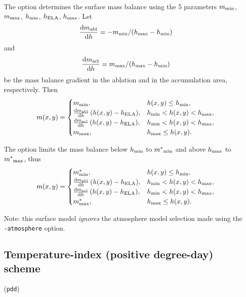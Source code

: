 \documentclass[titlepage,letterpaper,final]{scrartcl}
\begin{document}
The option  determines the surface mass balance using the 5 parameters ${m}_{\text{min}}$, ${m}_{\text{max}}$, ${h}_{\text{min}}$, ${h}_{\text{ELA}}$, ${h}_{\text{max}}$. Let
\begin{equation}
  \frac{\mathrm{d}{m}_{\text{abl}}}{\mathrm{d}h} = -{m}_{\text{min}} / ({h}_{\text{max}} - {h}_{\text{min}})
\end{equation}
and
\begin{equation}
\frac{\mathrm{d}{m}_{\text{acl}}}{\mathrm{d}h} = {m}_{\text{max}} / ({h}_{\text{max}} - {h}_{\text{min}})
\end{equation}
be the mass balance gradient in the ablation and in the accumulation area, respectively.  Then
\begin{equation}
  m(x,y) =
  \begin{cases}
   {m}_{\text{min}}, & h(x,y) \le {h}_{\text{min}}, \\
   \frac{\mathrm{d}{m}_{\text{abl}}}{\mathrm{d}h} \, (h(x,y) - h_{\text{ELA}}), &  {h}_{\text{min}} < h(x,y) < {h}_{\text{max}}, \\
   \frac{\mathrm{d}{m}_{\text{acl}}}{\mathrm{d}h} \, (h(x,y) - h_{\text{ELA}}), & {h}_{\text{min}} < h(x,y) < {h}_{\text{max}}, \\
   {m}_{\text{max}}, & {h}_{\text{max}} \le h(x,y).
 \end{cases}
\end{equation}

The option  limits the mass balance below ${h}_{\text{min}}$ to ${m^{*}}_{\text{min}}$ and above ${h}_{\text{max}}$ to ${m^{*}}_{\text{max}}$, thus
\begin{equation}
  m(x,y) =
  \begin{cases}
    m^{*}_{\text{min}}, & h(x,y) \le {h}_{\text{min}}, \\
    \frac{\mathrm{d}{m}_{\text{abl}}}{\mathrm{d}h} \, (h(x,y) - h_{\text{ELA}}), & {h}_{\text{min}} < h(x,y) < {h}_{\text{max}}, \\
    \frac{\mathrm{d}{m}_{\text{acl}}}{\mathrm{d}h} \, (h(x,y) - h_{\text{ELA}}), & {h}_{\text{min}} < h(x,y) < {h}_{\text{max}}, \\
    m^{*}_{\text{max}}, & {h}_{\text{max}} \le h(x,y).
  \end{cases}
\end{equation}

Note: this surface model \emph{ignores} the atmosphere model selection made using the \texttt{-atmosphere} option.

\subsection{Temperature-index (positive degree-day) scheme}
\label{sec:surface-pdd}

(\texttt{pdd})     
\end{document}
